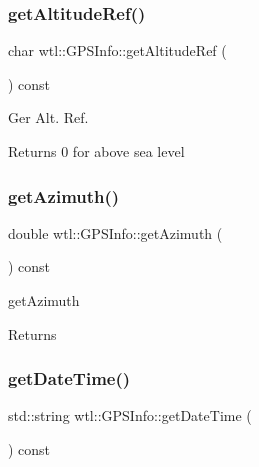 \subsubsection{\texorpdfstring{get\+Altitude\+Ref()}{getAltitudeRef()}}
{\footnotesize\ttfamily char wtl\+::\+G\+P\+S\+Info\+::get\+Altitude\+Ref (\begin{DoxyParamCaption}{ }\end{DoxyParamCaption}) const}



Ger Alt. Ref. 

\begin{DoxyReturn}{Returns}
0 for above sea level 
\end{DoxyReturn}
\mbox{\label{classwtl_1_1_g_p_s_info_abe29aaf63a203760e8f3f49473eaa19a}} 
\subsubsection{\texorpdfstring{get\+Azimuth()}{getAzimuth()}}
{\footnotesize\ttfamily double wtl\+::\+G\+P\+S\+Info\+::get\+Azimuth (\begin{DoxyParamCaption}{ }\end{DoxyParamCaption}) const}



get\+Azimuth 

\begin{DoxyReturn}{Returns}

\end{DoxyReturn}
\mbox{\label{classwtl_1_1_g_p_s_info_adc9b4d01e46a237066434494337e0925}} 
\subsubsection{\texorpdfstring{get\+Date\+Time()}{getDateTime()}}
{\footnotesize\ttfamily std\+::string wtl\+::\+G\+P\+S\+Info\+::get\+Date\+Time (\begin{DoxyParamCaption}{ }\end{DoxyParamCaption}) const}



